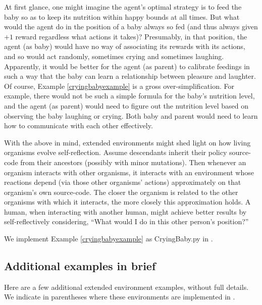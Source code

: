 \documentclass{article}
\begin{document}
At first glance, one might imagine the agent's optimal strategy is to feed the baby
so as to keep its nutrition within happy bounds at all times. But what would the
agent do in the position of a baby always so fed (and thus always given $+1$ reward
regardless what actions it takes)? Presumably, in that position, the agent (as baby) would have
no way of associating its rewards with its actions, and so would act randomly,
sometimes crying and sometimes laughing. Apparently, it would be better for the agent
(as parent) to calibrate feedings in such a way that the baby can learn a relationship
between pleasure and laughter. Of course, Example \ref{cryingbabyexample} is a gross
over-simplification. For example, there would not be such a simple formula for the
baby's nutrition level, and the agent (as parent) would need to figure out the nutrition level
based on observing the baby laughing or crying. Both baby and parent would need to
learn how to communicate with each other effectively.

With the above in mind, extended environments might shed light on how living organisms
evolve self-reflection. Assume descendants inherit their policy source-code from their ancestors
(possibly with minor mutations). Then whenever an organism interacts with other organisms,
it interacts with an environment whose reactions depend (via those other organisms' actions)
approximately on that organism's own source-code. The closer the organism is related
to the other organisms with which it interacts, the more closely this approximation holds.
A human, when interacting with another human, might achieve better results by self-reflectively
considering, ``What would I do in this other person's position?''

We implement Example \ref{cryingbabyexample} as CryingBaby.py in \cite{library}.

\subsection{Additional examples in brief}

Here are a few additional extended environment examples, without full details.
We indicate in parentheses where these environments are implemented in \cite{library}.
\end{document}
